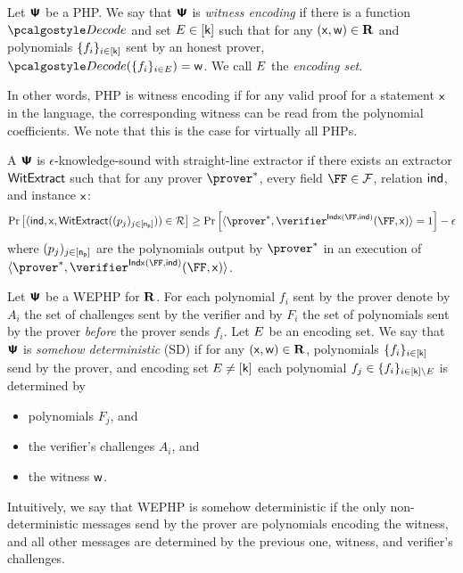 \documentclass[runningheads,11pt]{llncs}
\begin{document}
\begin{definition}
  \label{def:wephp}
  Let $\bm{\mathsf{\Psi}}$ be a PHP.  We say that $\bm{\mathsf{\Psi}}$ is \emph{witness encoding} if there is
  a function $\decode$ and set $E \in [\mathsf{k}]$ such that for any
  $(\mathsf{x}, \mathsf{w}) \in \mathbf{R}$ and polynomials $\{f_i\}_{i \in [\mathsf{k}]}$ sent by an
  honest prover, $\decode(\smallset{f_i}_{i \in \encset}) = \wit$. We call $E$ the
  \emph{encoding set}.
\end{definition}
In other words, PHP is witness encoding if for any valid proof for a statement
$\mathsf{x}$ in the language, the corresponding witness can be read from the
polynomial coefficients. We note that this is the case for virtually all
PHPs. 

\begin{definition}
\label{def:knownsound_wc_poly}
A $\bm{\mathsf{\Psi}}$ is $\epsilon$-knowledge-sound with straight-line extractor if there exists an
extractor $\mathsf{WitExtract}$ such that for any prover $\Pphp^*$, every field $\FF \in \Fam$,
relation ${\mathsf{ind}}$, and instance $\mathsf{x}$: 
\[ \Prob{ (\ind, \inp, \WitExtract(\tuple\pora{\nprv})) \in \relfam}
	\geq \Prob{ \braket{ \Pphp^*,\Vphp^{\Iphp(\FF,\ind)}(\FF,\inp) } = 1} - \epsilon
\]
where $(p_j)_{j \in [\mathsf{n_p}]}$ are the polynomials output by $\Pphp^*$ in an execution of
$\braket{\Pphp^*, \Vphp^{\Iphp(\FF,\ind)}(\FF,\inp)}$.
\end{definition}



\begin{definition}
  \label{def:sdwephp}
  Let $\bm{\mathsf{\Psi}}$ be a WEPHP for $\mathbf{R}$. For each polynomial $f_i$ sent by the prover
  denote by $A_i$ the set of challenges sent by the verifier and by $F_i$ the
  set of polynomials sent by the prover \emph{before} the prover sends
  $f_i$. Let $E$ be an encoding set. We say that $\bm{\mathsf{\Psi}}$ is \emph{somehow
    deterministic} (SD) if for any $(\mathsf{x}, \mathsf{w}) \in \mathbf{R}$, polynomials
  $\{f_i\}_{i \in [\mathsf{k}]}$ send by the prover, and encoding set
  $E \neq [\mathsf{k}]$ each polynomial
  $f_j \in \{f_i\}_{i \in [\mathsf{k}] \setminus E}$ is determined by
  \begin{itemize}
    \item polynomials $F_j$, and
    \item the verifier's challenges $A_i$, and
    \item the witness $\mathsf{w}$.
  \end{itemize}
\end{definition}
Intuitively, we say that WEPHP is somehow deterministic if the only
non-deterministic messages send by the prover are polynomials encoding the
witness, and all other messages are determined by the previous one, witness, and
verifier's challenges.
\end{document}
